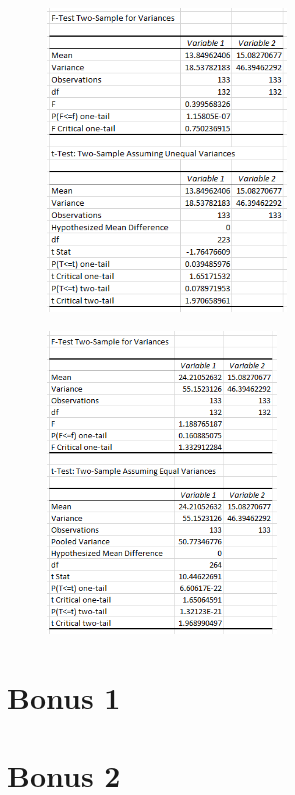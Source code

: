 \documentclass[11pt]{article}
\begin{document}
\begin{figure}[h]
\centering
\begin{minipage}{.5\textwidth}
\centering
  \includegraphics[width=2.5in]{assn1c_stat_anal_crossovers_set1.png}
  \label{fig:statanal1}
\end{minipage}%
\begin{minipage}{.5\textwidth}
\centering
  \includegraphics[width=2.4in]{assn1c_stat_anal_penalty_weight_1_set1.png}
  \label{fig:statanal2}
\end{minipage}
\end{figure}


\section{Bonus 1}


\section{Bonus 2}
\end{document}
